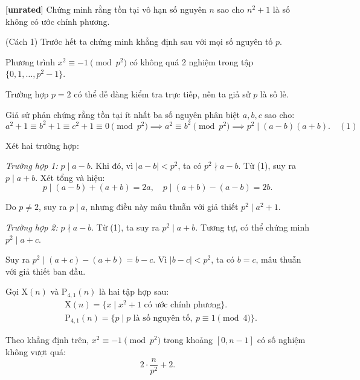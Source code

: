\documentclass[../05-largest-exponent.tex]{subfiles}
\begin{document}
\begin{example*}\label{example:CHN-2015-TST2-D2-P3}[\textbf{unrated}]
	Chứng minh rằng tồn tại vô hạn số nguyên \( n \) sao cho \( n^2 + 1 \) là số không có ước chính phương.
\end{example*}

\begin{soln}(Cách 1)\footnotemark
	Trước hết ta chứng minh khẳng định sau với mọi số nguyên tố \( p \).
	\begin{claim*}
		Phương trình $x^2 \equiv -1 \pmod{p^2}$ có không quá 2 nghiệm trong tập \( \{0,1,\dots,p^2-1\} \).
	\end{claim*}
	
	\begin{subproof}
		Trường hợp \( p = 2 \) có thể dễ dàng kiểm tra trực tiếp, nên ta giả sử \( p \) là số lẻ.
	
		Giả sử phản chứng rằng tồn tại ít nhất ba số nguyên phân biệt \( a, b, c \) sao cho:
		\[
			a^2 + 1 \equiv b^2 + 1 \equiv c^2 + 1 \equiv 0 \pmod{p^2} \implies a^2 \equiv b^2 \pmod{p^2} \implies p^2 \mid (a-b)(a+b). \quad (1)
		\]
		
		Xét hai trường hợp:
		
		\textit{Trường hợp 1:} \( p \mid a - b \). Khi đó, vì \( |a-b| < p^2 \), ta có \( p^2 \nmid a - b \). Từ (1), suy ra \( p \mid a + b \).  
		Xét tổng và hiệu:
		\[
			  p \mid (a-b) + (a+b) = 2a, \quad p \mid (a+b) - (a-b) = 2b.
		\]

		Do \( p \neq 2 \), suy ra \( p \mid a \), nhưng điều này mâu thuẫn với giả thiết \( p^2 \mid a^2 + 1 \).
	
		\textit{Trường hợp 2:} \( p \nmid a - b \). Từ (1), ta suy ra \( p^2 \mid a + b \). Tương tự, có thể chứng minh \( p^2 \mid a + c \).

		Suy ra \( p^2 \mid (a+c) - (a+b) = b - c \). Vì \( |b - c| < p^2 \), ta có \( b = c \), mâu thuẫn với giả thiết ban đầu.
	\end{subproof}
	
	Gọi \( \text{X}(n) \) và \( \text{P}_{4,1}(n) \) là hai tập hợp sau:
	\[
		\begin{aligned}
			&\text{X}(n) = \{ x \mid x^2 + 1 \text{ có ước chính phương} \}.\\
			&\text{P}_{4,1}(n) = \{ p \mid p \text{ là số nguyên tố},\ p \equiv 1 \pmod{4} \}.
		\end{aligned}
	\]

	Theo khẳng định trên, $x^2 \equiv -1 \pmod{p^2}$ trong khoảng \( [0, n-1] \) có số nghiệm không vượt quá:
	\[
		2 \cdot \frac{n}{p^2} + 2.
	\]
	

\end{soln}
\end{document}

